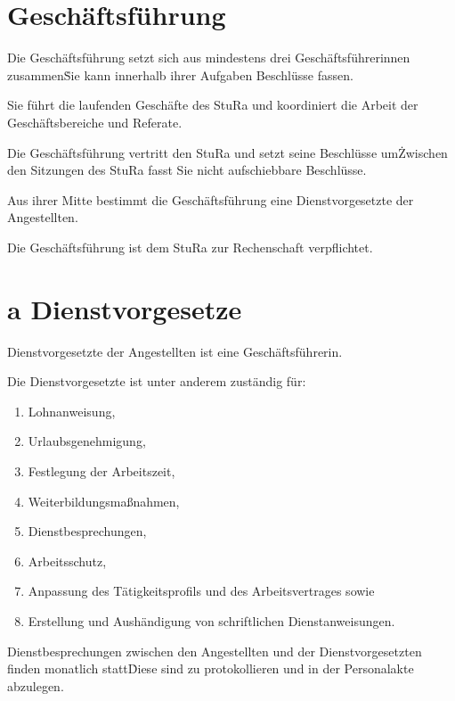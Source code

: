 \begin{multicols}{2}
\section{Geschäftsführung}

\Abs \Satz Die Geschäftsführung setzt sich aus mindestens drei Geschäftsführerinnen zusammen\. Sie kann innerhalb ihrer Aufgaben Beschlüsse fassen.

\Abs \Satz Sie führt die laufenden Geschäfte des StuRa und koordiniert die Arbeit der Geschäftsbereiche und Referate.

\Abs \Satz Die Geschäftsführung vertritt den StuRa und setzt seine Beschlüsse um\. Zwischen den Sitzungen des StuRa fasst Sie nicht aufschiebbare Beschlüsse.

\Abs \Satz Aus ihrer Mitte bestimmt die Geschäftsführung eine Dienstvorgesetzte der Angestellten.

\Abs \Satz Die Geschäftsführung ist dem StuRa zur Rechenschaft verpflichtet.



\setcounter{section}{26}
\section{a Dienstvorgesetze}

\Abs \Satz Dienstvorgesetzte der Angestellten ist eine Geschäftsführerin.

\Abs \Satz Die Dienstvorgesetzte ist unter anderem zuständig für:
\begin{enumerate}
\item Lohnanweisung,
\item Urlaubsgenehmigung,
\item Festlegung der Arbeitszeit,
\item Weiterbildungsmaßnahmen,
\item Dienstbesprechungen,
\item Arbeitsschutz,
\item Anpassung des Tätigkeitsprofils und des Arbeitsvertrages sowie
\item Erstellung und Aushändigung von schriftlichen Dienstanweisungen.
\end{enumerate}

\Abs \Satz Dienstbesprechungen zwischen den Angestellten und der Dienstvorgesetzten finden monatlich statt\. Diese sind zu protokollieren und in der Personalakte abzulegen.


\end{multicols}
